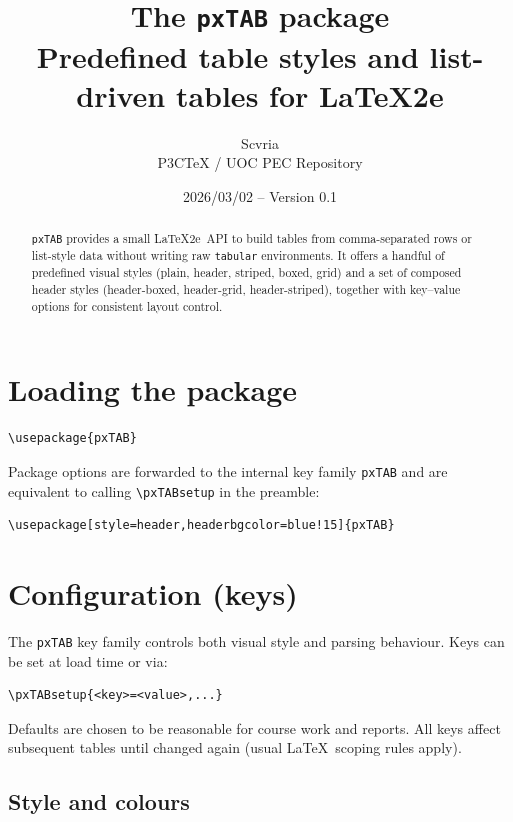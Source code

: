 \documentclass[11pt,a4paper]{article}
\title{The \texttt{pxTAB} package\\
  \large Predefined table styles and list-driven tables for \LaTeX2e}
\author{Scvria\\P3CTeX / UOC PEC Repository}
\date{2026/03/02 -- Version 0.1}
\begin{document}
\maketitle

\begin{abstract}
  \texttt{pxTAB} provides a small \LaTeX2e\ API to build tables from
  comma-separated rows or list-style data without writing raw
  \texttt{tabular} environments.  It offers a handful of predefined
  visual styles (plain, header, striped, boxed, grid) and a set of
  composed header styles (header-boxed, header-grid, header-striped),
  together with key--value options for consistent layout control.
\end{abstract}

\tableofcontents

\section{Loading the package}

\begin{verbatim}
\usepackage{pxTAB}
\end{verbatim}

Package options are forwarded to the internal key family \texttt{pxTAB}
and are equivalent to calling \verb|\pxTABsetup| in the preamble:

\begin{verbatim}
\usepackage[style=header,headerbgcolor=blue!15]{pxTAB}
\end{verbatim}

\section{Configuration (keys)}

The \texttt{pxTAB} key family controls both visual style and parsing
behaviour.  Keys can be set at load time or via:

\begin{verbatim}
\pxTABsetup{<key>=<value>,...}
\end{verbatim}

Defaults are chosen to be reasonable for course work and reports.
All keys affect subsequent tables until changed again (usual \LaTeX\
scoping rules apply).

\subsection*{Style and colours}
\end{document}
